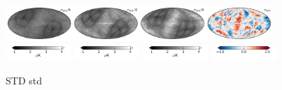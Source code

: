 \documentclass[twocolumn]{../../common/aa}
\begin{document}
\begin{figure}[p]
	\includegraphics[width=0.9\textwidth]{figures/090-WMAP_W4_std.pdf}
	\includegraphics[width=0.22\textwidth]{figures/cbar_std.pdf}
	\includegraphics[width=0.22\textwidth]{figures/cbar_std.pdf}
	\includegraphics[width=0.22\textwidth]{figures/cbar_std.pdf}
	\includegraphics[width=0.22\textwidth]{figures/cbar_rho.pdf}
	\caption{STD std}
        \label{fig:std}
\end{figure}
\end{document}
